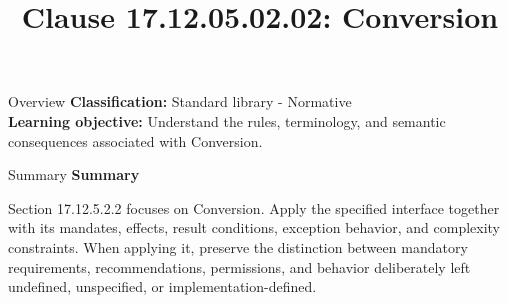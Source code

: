 \documentclass[10pt,letterpaper]{article}
\title{Clause 17.12.05.02.02: Conversion}
\author{}
\date{}
\begin{document}
\maketitle
\begin{CornellOverviewBox}{Overview}
\textbf{Classification:} Standard library - Normative\\[2pt]
\textbf{Learning objective:} Understand the rules, terminology, and semantic consequences associated with Conversion.
\end{CornellOverviewBox}\begin{CornellSummaryBox}{Summary}
{\sffamily\bfseries\color{Accent} Summary}\par\vspace{3pt}Section 17.12.5.2.2 focuses on Conversion. Apply the specified interface together with its mandates, effects, result conditions, exception behavior, and complexity constraints. When applying it, preserve the distinction between mandatory requirements, recommendations, permissions, and behavior deliberately left undefined, unspecified, or implementation-defined.
\end{CornellSummaryBox}
\end{document}
